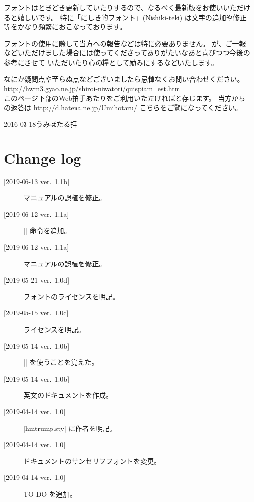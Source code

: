 \documentclass{jlreq}
\begin{document}
フォントはときどき更新していたりするので、なるべく最新版をお使いいただけると嬉しいです。
特に「にしき的フォント」(Nishiki-teki) は文字の追加や修正等をかなり頻繁におこなっております。

フォントの使用に際して当方への報告などは特に必要ありません。
が、ご一報などいただけました場合には使ってくださってありがたいなあと喜びつつ今後の参考にさせて
いただいたり心の糧として励みにするなどいたします。

なにか疑問点や至らぬ点などございましたら忌憚なくお問い合わせください。\\
\url{http://hwm3.gyao.ne.jp/shiroi-niwatori/quispiam_est.htm}\\
このページ下部のWeb拍手あたりをご利用いただければと存じます。
当方からの返答は \url{http://d.hatena.ne.jp/Umihotaru/} こちらをご覧になってください。


\hspace{3\zw}2016-03-18\hspace{1\zw}うみほたる拝
\egroup

\section{Change log}
\begin{description}
\item[{[2019-06-13 ver.~1.1b]}] マニュアルの誤植を修正。
\item[{[2019-06-12 ver.~1.1a]}] |\unitrump| 命令を追加。
\item[{[2019-06-12 ver.~1.1a]}] マニュアルの誤植を修正。
\item[{[2019-05-21 ver.~1.0d]}] フォントのライセンスを明記。
\item[{[2019-05-15 ver.~1.0c]}] ライセンスを明記。
\item[{[2019-05-14 ver.~1.0b]}] |\@undefined| を使うことを覚えた。
\item[{[2019-05-14 ver.~1.0b]}] 英文のドキュメントを作成。
\item[{[2019-04-14 ver.~1.0]}] |hmtrump.sty| に作者を明記。
\item[{[2019-04-14 ver.~1.0]}] ドキュメントのサンセリフフォントを変更。
\item[{[2019-04-14 ver.~1.0]}] TO DO を追加。
\end{description}
\end{document}
